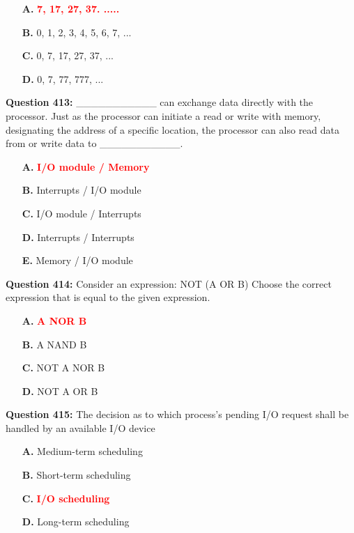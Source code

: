 \documentclass[12pt,a4paper]{article}
\begin{document}
\begin{itemize}
    \item[\textbf{A.}] \textcolor{red}{\textbf{7, 17, 27, 37. .....}}
    \item[\textbf{B.}] 0, 1, 2, 3, 4, 5, 6, 7, ...
    \item[\textbf{C.}] 0, 7, 17, 27, 37, ...
    \item[\textbf{D.}] 0, 7, 77, 777, ...
\end{itemize}

\vspace{0.5cm}

\textbf{Question 413:} ___________ can exchange data directly with the processor. Just as the processor can initiate a read or write with memory, designating the address of a specific location, the processor can also read data from or write data to ___________.

\begin{itemize}
    \item[\textbf{A.}] \textcolor{red}{\textbf{I/O module / Memory}}
    \item[\textbf{B.}] Interrupts / I/O module
    \item[\textbf{C.}] I/O module / Interrupts
    \item[\textbf{D.}] Interrupts / Interrupts
    \item[\textbf{E.}] Memory / I/O module
\end{itemize}

\vspace{0.5cm}

\textbf{Question 414:} Consider an expression: NOT (A OR B) Choose the correct expression that is equal to the given expression.

\begin{itemize}
    \item[\textbf{A.}] \textcolor{red}{\textbf{A NOR B}}
    \item[\textbf{B.}] A NAND B
    \item[\textbf{C.}] NOT A NOR B
    \item[\textbf{D.}] NOT A OR B
\end{itemize}

\vspace{0.5cm}

\textbf{Question 415:} The decision as to which process's pending I/O request shall be handled by an available I/O device

\begin{itemize}
    \item[\textbf{A.}] Medium-term scheduling
    \item[\textbf{B.}] Short-term scheduling
    \item[\textbf{C.}] \textcolor{red}{\textbf{I/O scheduling}}
    \item[\textbf{D.}] Long-term scheduling
\end{itemize}
\end{document}

